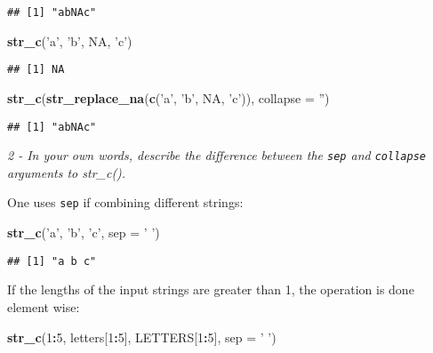 \documentclass[]{article}
\newenvironment{Shaded}{\begin{snugshade}}{\end{snugshade}}
\newcommand{\KeywordTok}[1]{\textcolor[rgb]{0.13,0.29,0.53}{\textbf{#1}}}
\newcommand{\DataTypeTok}[1]{\textcolor[rgb]{0.13,0.29,0.53}{#1}}
\newcommand{\DecValTok}[1]{\textcolor[rgb]{0.00,0.00,0.81}{#1}}
\newcommand{\StringTok}[1]{\textcolor[rgb]{0.31,0.60,0.02}{#1}}
\newcommand{\OtherTok}[1]{\textcolor[rgb]{0.56,0.35,0.01}{#1}}
\newcommand{\OperatorTok}[1]{\textcolor[rgb]{0.81,0.36,0.00}{\textbf{#1}}}
\newcommand{\NormalTok}[1]{#1}
\theoremstyle{definition}
\theoremstyle{definition}
\theoremstyle{definition}
\theoremstyle{remark}
\begin{document}
\begin{verbatim}
## [1] "abNAc"
\end{verbatim}

\begin{Shaded}
\begin{Highlighting}[]
\KeywordTok{str_c}\NormalTok{(}\StringTok{'a'}\NormalTok{, }\StringTok{'b'}\NormalTok{, }\OtherTok{NA}\NormalTok{, }\StringTok{'c'}\NormalTok{)}
\end{Highlighting}
\end{Shaded}

\begin{verbatim}
## [1] NA
\end{verbatim}

\begin{Shaded}
\begin{Highlighting}[]
\KeywordTok{str_c}\NormalTok{(}\KeywordTok{str_replace_na}\NormalTok{(}\KeywordTok{c}\NormalTok{(}\StringTok{'a'}\NormalTok{, }\StringTok{'b'}\NormalTok{, }\OtherTok{NA}\NormalTok{, }\StringTok{'c'}\NormalTok{)), }\DataTypeTok{collapse =} \StringTok{''}\NormalTok{)}
\end{Highlighting}
\end{Shaded}

\begin{verbatim}
## [1] "abNAc"
\end{verbatim}

\emph{2 - In your own words, describe the difference between the
\texttt{sep} and \texttt{collapse} arguments to str\_c().}

One uses \texttt{sep} if combining different strings:

\begin{Shaded}
\begin{Highlighting}[]
\KeywordTok{str_c}\NormalTok{(}\StringTok{'a'}\NormalTok{, }\StringTok{'b'}\NormalTok{, }\StringTok{'c'}\NormalTok{, }\DataTypeTok{sep =} \StringTok{' '}\NormalTok{)}
\end{Highlighting}
\end{Shaded}

\begin{verbatim}
## [1] "a b c"
\end{verbatim}

If the lengths of the input strings are greater than 1, the operation is
done element wise:

\begin{Shaded}
\begin{Highlighting}[]
\KeywordTok{str_c}\NormalTok{(}\DecValTok{1}\OperatorTok{:}\DecValTok{5}\NormalTok{, letters[}\DecValTok{1}\OperatorTok{:}\DecValTok{5}\NormalTok{], LETTERS[}\DecValTok{1}\OperatorTok{:}\DecValTok{5}\NormalTok{], }\DataTypeTok{sep =} \StringTok{' '}\NormalTok{)}
\end{Highlighting}
\end{Shaded}
\end{document}
